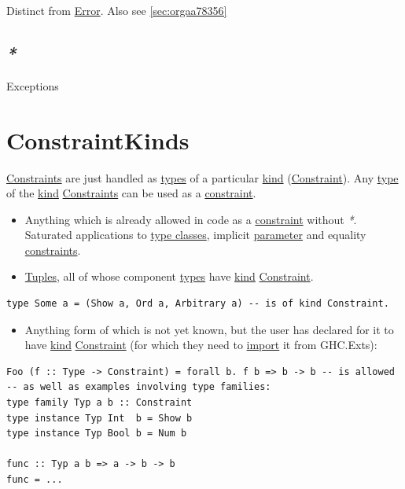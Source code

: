 \documentclass[a4paper,14pt,oneside]{book}
\begin{document}
Distinct from \hyperref[org03989bd]{Error}. Also see \ref{sec:orgaa78356}

\section{\emph{*}}
\label{sec:org03b0853}

\label{orgd719405}Exceptions

\chapter{\label{org70131c2}ConstraintKinds}
\label{sec:org2d4d70a}
\hyperref[org7ab0abf]{Constraints} are just handled as \hyperref[org40b6d66]{types} of a particular \hyperref[org9173944]{kind} (\hyperref[org5071db7]{Constraint}).
Any \hyperref[org4e3af4c]{type} of the \hyperref[org9173944]{kind} \hyperref[org7ab0abf]{Constraints} can be used as a \hyperref[org5071db7]{constraint}.
\begin{itemize}
\item Anything which is already allowed in code as a \hyperref[org5071db7]{constraint} without \emph{*}. Saturated applications to \hyperref[org8ceb2d1]{type classes}, implicit \hyperref[org303bcf7]{parameter} and equality \hyperref[org7ab0abf]{constraints}.
\item \hyperref[org4c6a912]{Tuples}, all of whose component \hyperref[org40b6d66]{types} have \hyperref[org9173944]{kind} \hyperref[org5071db7]{Constraint}.
\end{itemize}
\begin{verbatim}
type Some a = (Show a, Ord a, Arbitrary a) -- is of kind Constraint.
\end{verbatim}
\begin{itemize}
\item Anything form of which is not yet known, but the user has declared for it to have \hyperref[org9173944]{kind} \hyperref[org5071db7]{Constraint} (for which they need to \hyperref[orgf1abe8c]{import} it from GHC.Exts):
\end{itemize}
\begin{verbatim}
Foo (f :: Type -> Constraint) = forall b. f b => b -> b -- is allowed
-- as well as examples involving type families:
type family Typ a b :: Constraint
type instance Typ Int  b = Show b
type instance Typ Bool b = Num b

func :: Typ a b => a -> b -> b
func = ...
\end{verbatim}
\end{document}
